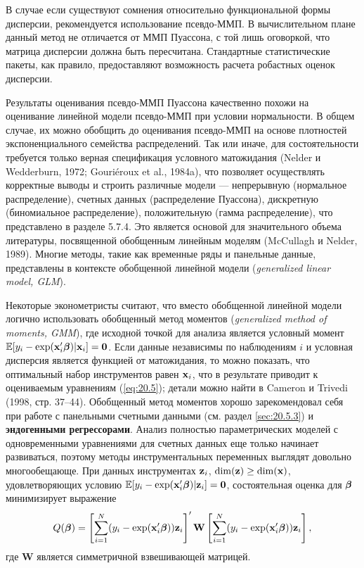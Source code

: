 В случае если существуют сомнения относительно функциональной формы дисперсии, рекомендуется использование псевдо-ММП. В вычислительном плане данный метод не отличается от ММП Пуассона, с той лишь оговоркой, что матрица дисперсии должна быть пересчитана. Стандартные статистические пакеты, как правило, предоставляют возможность расчета робастных оценок дисперсии.

Результаты оценивания псевдо-ММП Пуассона качественно похожи на оценивание линейной модели псевдо-ММП при условии нормальности. В общем случае, их можно обобщить до оценивания псевдо-ММП на основе плотностей экспоненциального семейства распределений. Так или иначе, для состоятельности требуется только верная спецификация условного матожидания (Nelder и Wedderburn, 1972; Gouri\'eroux et al., 1984a), что позволяет осуществлять корректные выводы и строить различные модели --- непрерывную (нормальное распределение), счетных данных (распределение Пуассона), дискретную (биномиальное распределение), положительную (гамма распределение), что представлено в разделе 5.7.4. Это является основой для значительного объема литературы, посвященной обобщенным линейным моделям (McCullagh и Nelder, 1989). Многие методы, такие как временные ряды и панельные данные, представлены в контексте обобщенной линейной модели (\textit{generalized linear model, GLM}).

Некоторые эконометристы считают, что вместо обобщенной линейной модели логично использовать обобщенный метод моментов (\textit{generalized method of moments, GMM}), где исходной точкой для анализа является условный момент $\mathbb{E}[y_i - \exp(\mathbf{x}_i'\bm{\beta})|\mathbf{x}_i] = \mathbf{0}$. Если данные независимы по наблюдениям $i$ и условная дисперсия является функцией от матожидания, то можно показать, что оптимальный набор инструментов равен $\mathbf{x}_i$, что в результате приводит к оцениваемым уравнениям (\ref{eq:20.5}); детали можно найти в Cameron и Trivedi (1998, стр. 37--44). Обобщенный метод моментов хорошо зарекомендовал себя при работе с панельными счетными данными (см. раздел \ref{sec:20.5.3}) и \textbf{эндогенными регрессорами}. Анализ полностью параметрических моделей с одновременными уравнениями для счетных данных еще только начинает развиваться, поэтому методы инструментальных переменных выглядят довольно многообещающе. При данных инструментах $\mathbf{z}_i$, $\dim (\mathbf{z}) \ge \dim(\mathbf{x})$, удовлетворяющих условию $\mathbb{E}[y_i - \exp(\mathbf{x}_i'\bm{\beta})|\mathbf{z}_i] = \mathbf{0}$, состоятельная оценка для $\bm{\beta}$ минимизирует выражение
    \begin{align}\label{eq:20.20}
    Q(\bm{\beta}) = \left[ \sum^{N}_{i = 1} (y_i - \exp(\mathbf{x}_i'\bm{\beta}))\mathbf{z}_i\right]' \mathbf{W} \left[ \sum^{N}_{i = 1} (y_i - \exp(\mathbf{x}_i'\bm{\beta}))\mathbf{z}_i\right],
    \end{align}
где $\mathbf{W}$ является симметричной взвешивающей матрицей.

